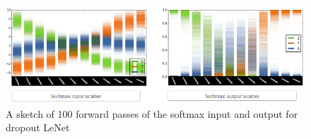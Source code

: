 \begin{figure}[H]
    \centering
    \includegraphics[width=\textwidth]{labs/12/images/Classification_multi.png}
    \caption{A sketch of 100 forward passes of the softmax input and output for dropout LeNet}
    \label{fig:classification_multi}
\end{figure}